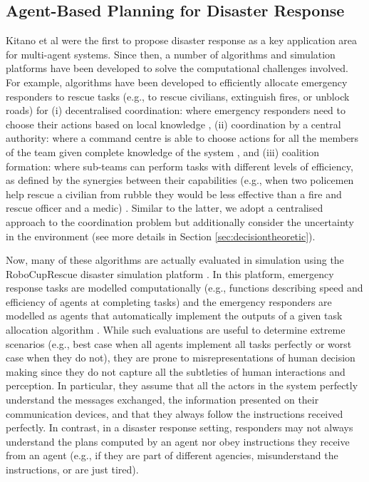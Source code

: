 \subsection{Agent-Based Planning for Disaster Response}\label{sec:agentsdisasters}
Kitano et al \cite{kitano:2001} were the first to propose disaster response as a key application area for multi-agent systems. Since then, a number of algorithms and simulation platforms have been developed to solve the computational challenges involved. For example, algorithms  have been developed to efficiently allocate emergency responders to rescue tasks (e.g., to rescue civilians, extinguish fires, or unblock roads) for (i) decentralised coordination: where emergency responders need to choose their actions based on local knowledge \cite{Chapman2009,puyol:etal:2014}, (ii)  coordination by a central authority: where a command centre is able to choose actions for all the members of the team given complete knowledge of the system \cite{koes2006constraint,Scerri2005,Khan-2011-JAAMAS}, and (iii) coalition formation: where sub-teams can perform tasks with different levels of efficiency, as defined by the synergies between their capabilities (e.g., when two policemen help rescue a civilian from rubble they would be less effective than a fire and rescue officer and a medic) \cite{ramchurn:etal:2010}.  Similar to the latter, we  adopt a centralised approach to the coordination problem but additionally consider the uncertainty in the environment (see more details in Section \ref{sec:decisiontheoretic}).

Now, many of these algorithms are actually evaluated in simulation using the  RoboCupRescue disaster simulation platform \cite{skinner:ramchurn:2010}. In this platform, emergency response tasks are modelled computationally (e.g., functions describing speed and efficiency of agents at completing tasks) and the emergency responders are modelled as agents that automatically implement the outputs of a given task allocation algorithm \cite{kleiner:etal:2013,ramchurn:etal:2010}. While such evaluations are useful to determine extreme scenarios (e.g., best case when all agents implement all tasks perfectly or worst case when they do not), they are prone to misrepresentations of human decision making since they do not capture all the subtleties of human interactions and perception. In particular, they assume that all the actors in the system perfectly understand the messages exchanged, the information presented on their communication devices, and that they always follow the instructions received perfectly. In contrast, in a disaster response setting, responders may not  always understand the plans computed by an agent nor obey instructions they receive from an agent (e.g., if they are part of different agencies, misunderstand the instructions, or are just tired).

